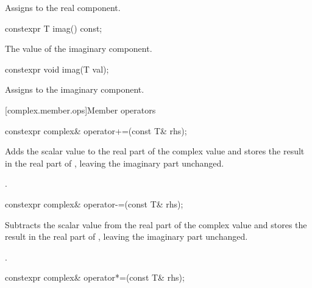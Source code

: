 \begin{itemdescr}
\pnum
\effects Assigns  to the real component.
\end{itemdescr}

%
\begin{itemdecl}
constexpr T imag() const;
\end{itemdecl}

\begin{itemdescr}
\pnum
\returns The value of the imaginary component.
\end{itemdescr}

%
\begin{itemdecl}
constexpr void imag(T val);
\end{itemdecl}

\begin{itemdescr}
\pnum
\effects Assigns  to the imaginary component.
\end{itemdescr}

[complex.member.ops]{Member operators}

%
\begin{itemdecl}
constexpr complex& operator+=(const T& rhs);
\end{itemdecl}

\begin{itemdescr}
\pnum
\effects
Adds the scalar value  to the real part of the complex value
and stores the result in the real part of
,
leaving the imaginary part unchanged.

\pnum
\returns
{}.
\end{itemdescr}

%
\begin{itemdecl}
constexpr complex& operator-=(const T& rhs);
\end{itemdecl}

\begin{itemdescr}
\pnum
\effects
Subtracts the scalar value  from the real part of the complex value
and stores the result in the real part of
,
leaving the imaginary part unchanged.

\pnum
\returns
{}.
\end{itemdescr}

%
\begin{itemdecl}
constexpr complex& operator*=(const T& rhs);
\end{itemdecl}

